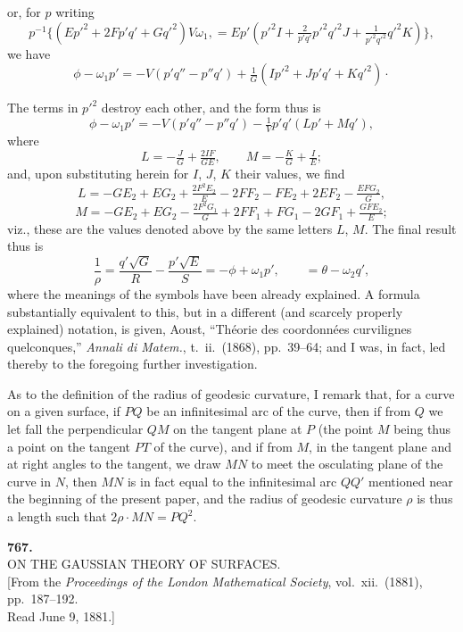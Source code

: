 \documentclass[11pt,a4paper]{article}
\begin{document}
\newpage
\noindent
or, for $p$ writing
\[
  p^{-1}\{(Ep'^{2}+2Fp'q'+Gq'^{2})V\omega_{1},
  =Ep'(p'^{2}I+\tfrac{2}{p'q'}p'^{2}q'^{2}J+\tfrac{1}{p'^{2}q'^{2}}q'^{2}K)\},
\]
we have
\[
  \phi-\omega_{1}p'=-V(p'q''-p''q')+\tfrac{1}{G}(Ip'^{2}+Jp'q'+Kq'^{2})\cdot
\]

The terms in $p'^{2}$ destroy each other, and the form thus is
\[
  \phi-\omega_{1}p'=-V(p'q''-p''q')-\tfrac{1}{V}p'q'(Lp'+Mq'),
\]
where
\[
  L=-\tfrac{J}{G}+\tfrac{2IF}{GE},\qquad M=-\tfrac{K}{G}+\tfrac{I}{E};
\]
and, upon substituting herein for $I$, $J$, $K$ their values, we find
\[
  L=-GE_{2}+EG_{2}+\tfrac{2F^{2}E_{2}}{E}-2FF_{2}-FE_{2}+2EF_{2}-\tfrac{EFG_{2}}{G},
\]
\[
  M=-GE_{2}+EG_{2}-\tfrac{2F^{2}G_{1}}{G}+2FF_{1}+FG_{1}-2GF_{1}+\tfrac{GFE_{2}}{E};
\]
viz., these are the values denoted above by the same letters $L$,
$M$. The final result thus is
\[
  \frac{1}{\rho}=\frac{q'\sqrt{G}}{R}-\frac{p'\sqrt{E}}{S}=-\phi+\omega_{1}p',\qquad =\theta-\omega_{2}q',
\]
where the meanings of the symbols have been already explained. A
formula substantially equivalent to this, but in a different (and
scarcely properly explained) notation, is given, Aoust, ``Th\'eorie des
coordonn\'ees curvilignes quelconques,'' \textit{Annali di Matem.},
t.~ii.\ (1868), pp.~39--64; and I was, in fact, led thereby to the
foregoing further investigation.

As to the definition of the radius of geodesic curvature, I remark
that, for a curve on a given surface, if $PQ$ be an infinitesimal arc
of the curve, then if from $Q$ we let fall the perpendicular $QM$ on
the tangent plane at $P$ (the point $M$ being thus a point on the
tangent $PT$ of the curve), and if from $M$, in the tangent plane and
at right angles to the tangent, we draw $MN$ to meet the osculating
plane of the curve in $N$, then $MN$ is in fact equal to the
infinitesimal arc $QQ'$ mentioned near the beginning of the present
paper, and the radius of geodesic curvature $\rho$ is thus a length
such that $2\rho\cdot MN=PQ^{2}$.

\bigskip


\begin{center}
\textbf{767.}\\[4pt]
\textsc{ON THE GAUSSIAN THEORY OF SURFACES.}\\[4pt]
[From the \textit{Proceedings of the London Mathematical Society},
vol.\ xii.\ (1881), pp.\ 187--192.\\
Read June 9, 1881.]
\end{center}
\end{document}
